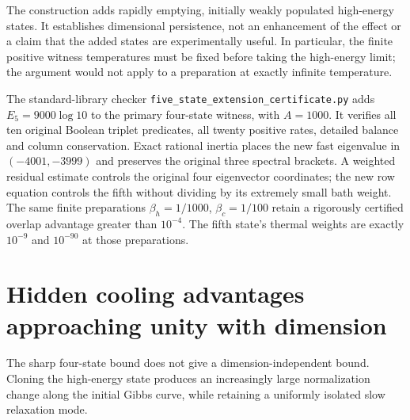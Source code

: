 \documentclass[11pt]{article}
\begin{document}
The construction adds rapidly emptying, initially weakly populated high-energy
states. It establishes dimensional persistence, not an enhancement of the
effect or a claim that the added states are experimentally useful. In
particular, the finite positive witness temperatures must be fixed before
taking the high-energy limit; the argument would not apply to a preparation
at exactly infinite temperature.

The standard-library checker \texttt{five\_state\_extension\_certificate.py}
adds $E_5=9000\log10$ to the primary four-state witness, with $A=1000$.
It verifies all ten original Boolean triplet predicates, all twenty positive
rates, detailed balance and column conservation. Exact rational inertia
places the new fast eigenvalue in $(-4001,-3999)$ and preserves the original
three spectral brackets. A weighted residual estimate controls the original
four eigenvector coordinates; the new row equation controls the fifth without
dividing by its extremely small bath weight. The same finite preparations
$\beta_h=1/1000$, $\beta_c=1/100$ retain a rigorously certified overlap
advantage greater than $10^{-4}$. The fifth state's thermal weights are
exactly $10^{-9}$ and $10^{-90}$ at those preparations.

\section{Hidden cooling advantages approaching unity with dimension}
\label{sec:highdimamplitude}
The sharp four-state bound does not give a dimension-independent bound.
Cloning the high-energy state produces an increasingly large normalization
change along the initial Gibbs curve, while retaining a uniformly isolated
slow relaxation mode.
\end{document}
